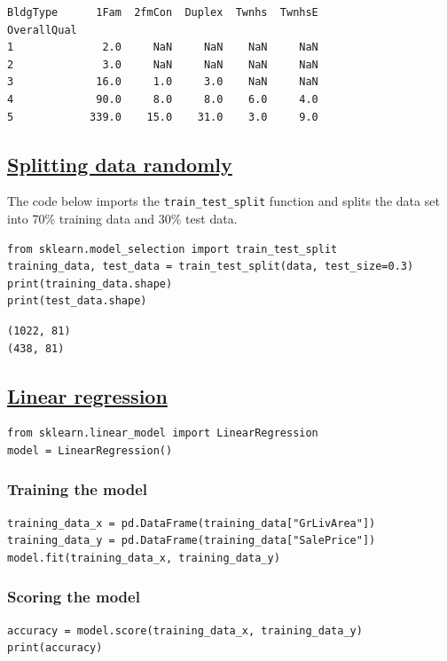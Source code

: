 \documentclass[11pt]{article}
\begin{document}
\begin{verbatim}
BldgType      1Fam  2fmCon  Duplex  Twnhs  TwnhsE
OverallQual
1              2.0     NaN     NaN    NaN     NaN
2              3.0     NaN     NaN    NaN     NaN
3             16.0     1.0     3.0    NaN     NaN
4             90.0     8.0     8.0    6.0     4.0
5            339.0    15.0    31.0    3.0     9.0
\end{verbatim}


 \newpage
\subsection{\href{https://scikit-learn.org/stable/modules/generated/sklearn.model\_selection.train\_test\_split.html}{Splitting data randomly}}
\label{sec:org7ec34db}
The code below imports the \texttt{train\_test\_split} function and splits the data set into 70\% training data and 30\% test data.
\begin{verbatim}
from sklearn.model_selection import train_test_split
training_data, test_data = train_test_split(data, test_size=0.3)
print(training_data.shape)
print(test_data.shape)
\end{verbatim}

\label{orgd667174}
\begin{verbatim}
(1022, 81)
(438, 81)
\end{verbatim}
\subsection{\href{https://scikit-learn.org/stable/modules/generated/sklearn.linear\_model.LinearRegression.html}{Linear regression}}
\label{sec:org4649b56}
\begin{verbatim}
from sklearn.linear_model import LinearRegression
model = LinearRegression()
\end{verbatim}
\subsubsection{Training the model}
\label{sec:orgdac5f3a}
\begin{verbatim}
training_data_x = pd.DataFrame(training_data["GrLivArea"])
training_data_y = pd.DataFrame(training_data["SalePrice"])
model.fit(training_data_x, training_data_y)
\end{verbatim}
\subsubsection{Scoring the model}
\label{sec:org1c4a97d}
\begin{verbatim}
accuracy = model.score(training_data_x, training_data_y)
print(accuracy)
\end{verbatim}
\end{document}
